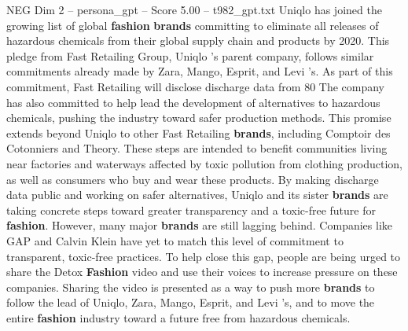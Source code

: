 \begin{textsample}{NEG Dim 2 – persona\_gpt – Score 5.00 – t982\_gpt.txt}  \label{ex:f2_neg_050}
Uniqlo has joined the growing list of global \textbf{fashion} \textbf{brands} committing to eliminate all releases of hazardous chemicals from their global supply chain and products by 2020.
This pledge from Fast Retailing Group, Uniqlo ’s parent company, follows similar commitments already made by Zara, Mango, Esprit, and Levi ’s.
As part of this commitment, Fast Retailing will disclose discharge data from 80 %
The company has also committed to help lead the development of alternatives to hazardous chemicals, pushing the industry toward safer production methods.
This promise extends beyond Uniqlo to other Fast Retailing \textbf{brands}, including Comptoir des Cotonniers and Theory.
These steps are intended to benefit communities living near factories and waterways affected by toxic pollution from clothing production, as well as consumers who buy and wear these products.
By making discharge data public and working on safer alternatives, Uniqlo and its sister \textbf{brands} are taking concrete steps toward greater transparency and a toxic-free future for \textbf{fashion}.
However, many major \textbf{brands} are still lagging behind.
Companies like GAP and Calvin Klein have yet to match this level of commitment to transparent, toxic-free practices.
To help close this gap, people are being urged to share the Detox \textbf{Fashion} video and use their voices to increase pressure on these companies.
Sharing the video is presented as a way to push more \textbf{brands} to follow the lead of Uniqlo, Zara, Mango, Esprit, and Levi ’s, and to move the entire \textbf{fashion} industry toward a future free from hazardous chemicals.

\end{textsample}
